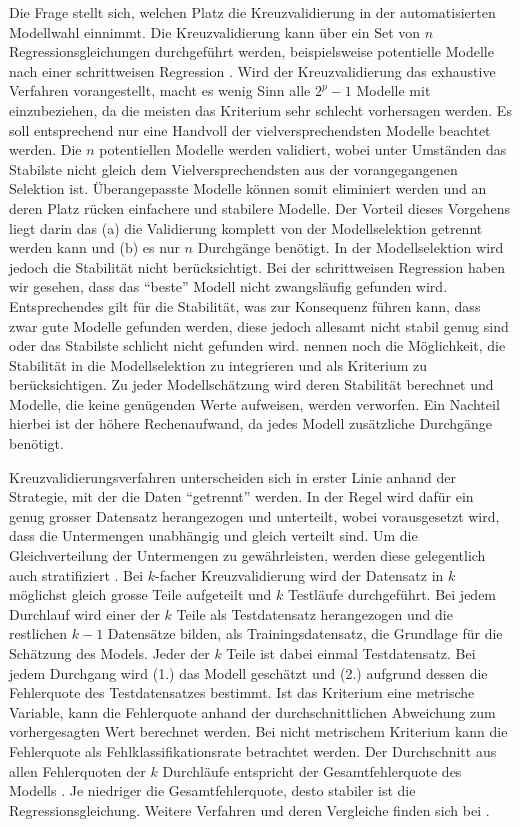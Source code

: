 Die Frage stellt sich, welchen Platz die Kreuzvalidierung in der automatisierten Modellwahl einnimmt.
Die Kreuzvalidierung kann über ein Set von $n$ Regressionsgleichungen durchgeführt werden, beispielsweise  potentielle Modelle nach einer schrittweisen Regression \cite[p. 12]{arlot2010survey}. Wird der Kreuzvalidierung das exhaustive Verfahren vorangestellt, macht es wenig Sinn alle $2^p-1$ Modelle mit einzubeziehen, da die meisten das Kriterium sehr schlecht vorhersagen werden.  Es soll entsprechend nur eine Handvoll der vielversprechendsten Modelle beachtet werden. 
Die $n$ potentiellen Modelle werden validiert, wobei unter Umständen das Stabilste nicht gleich dem Vielversprechendsten aus der vorangegangenen Selektion ist.
Überangepasste Modelle können somit eliminiert werden und an deren Platz rücken einfachere und stabilere Modelle.
Der Vorteil dieses Vorgehens liegt darin das (a) die Validierung komplett von der Modellselektion getrennt werden kann und (b) es nur $n$ Durchgänge benötigt. 
In der Modellselektion wird jedoch die Stabilität nicht berücksichtigt. 
Bei der schrittweisen Regression haben wir gesehen, dass das ``beste'' Modell nicht zwangsläufig gefunden wird.
Entsprechendes gilt für die Stabilität, was zur Konsequenz führen kann, dass zwar gute Modelle gefunden werden, diese jedoch allesamt nicht stabil genug sind oder das Stabilste schlicht nicht gefunden wird. 
 nennen noch die Möglichkeit, die Stabilität in die Modellselektion zu integrieren und als  Kriterium zu berücksichtigen. 
Zu jeder Modellschätzung wird deren Stabilität berechnet und Modelle, die keine genügenden Werte aufweisen, werden verworfen. 
Ein Nachteil hierbei ist der höhere Rechenaufwand, da jedes Modell zusätzliche Durchgänge benötigt. 

Kreuzvalidierungsverfahren unterscheiden sich in erster Linie anhand der Strategie, mit der die Daten ``getrennt'' werden.
In der Regel wird dafür ein genug grosser Datensatz herangezogen und unterteilt, wobei vorausgesetzt wird, dass die Untermengen unabhängig und gleich verteilt sind.
Um die Gleichverteilung der Untermengen zu gewährleisten, werden diese gelegentlich auch stratifiziert \cite{diamantidis2000unsupervised}.
Bei $k$-facher Kreuzvalidierung wird der Datensatz in $k$ möglichst gleich grosse Teile aufgeteilt und $k$ Testläufe durchgeführt. Bei jedem Durchlauf wird einer der $k$ Teile als Testdatensatz herangezogen und die restlichen $k-1$ Datensätze bilden, als Trainingsdatensatz, die Grundlage für die Schätzung des Models. Jeder der $k$ Teile ist dabei einmal Testdatensatz. Bei jedem Durchgang wird (1.) das Modell geschätzt und (2.) aufgrund dessen die Fehlerquote des Testdatensatzes bestimmt. Ist das Kriterium eine metrische Variable, kann die Fehlerquote anhand der durchschnittlichen Abweichung zum vorhergesagten Wert berechnet werden. Bei nicht metrischem Kriterium kann die Fehlerquote als Fehlklassifikationsrate betrachtet werden. 
Der Durchschnitt aus allen Fehlerquoten der $k$ Durchläufe entspricht der Gesamtfehlerquote des Modells \cite[p. 14]{arlot2010survey}.
Je niedriger die Gesamtfehlerquote, desto stabiler ist die Regressionsgleichung.
Weitere Verfahren und deren Vergleiche finden sich bei .

